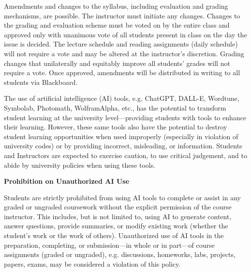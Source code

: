 \documentclass[11pt,letterpaper]{article}
\begin{document}

Amendments and changes to the syllabus, including evaluation and grading mechanisms, are possible. The instructor must initiate any changes. Changes to the grading and evaluation scheme must be voted on by the entire class and approved only with unanimous vote of all students present in class on the day the issue is decided. The lecture schedule and reading assignments (daily schedule) will not require a vote and may be altered at the instructor's discretion. Grading changes that unilaterally and equitably improve all students' grades will not require a vote. Once approved, amendments will be distributed in writing to all students via Blackboard. \sectionbreak




The use of artificial intelligence (AI) tools, e.g. ChatGPT, DALL-E, Wordtune, Symbolab, Photomath, WolframAlpha, etc., has the potential to transform student learning at the university level---providing students with tools to enhance their learning. However, these same tools also have the potential to destroy student learning opportunities when used improperly (especially in violation of university codes) or by providing incorrect, misleading, or information. Students and Instructors are expected to exercise caution, to use critical judgement, and to abide by university policies when using these tools. \pspace



{\bfseries Prohibition on Unauthorized AI Use} \par
Students are strictly prohibited from using AI tools to complete or assist in any graded or ungraded coursework without the explicit permission of the course instructor. This includes, but is not limited to, using AI to generate content, answer questions, provide summaries, or modify existing work (whether the student's work or the work of others). Unauthorized use of AI tools in the preparation, completing, or submission---in whole or in part---of course assignments (graded or ungraded), e.g. discussions, homeworks, labs, projects, papers, exams, may be considered a violation of this policy. \pspace
\end{document}
